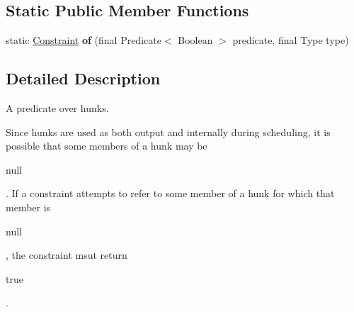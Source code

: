 \subsection*{Static Public Member Functions}
\begin{DoxyCompactItemize}
\item 
\hypertarget{interfaceosd_1_1considerations_1_1_constraint_aa9c71385c629e7bc5d9361f707d39622}{static \hyperlink{interfaceosd_1_1considerations_1_1_constraint}{Constraint} {\bfseries of} (final Predicate$<$ Boolean $>$ predicate, final Type type)}\label{interfaceosd_1_1considerations_1_1_constraint_aa9c71385c629e7bc5d9361f707d39622}

\end{DoxyCompactItemize}


\subsection{Detailed Description}
A predicate over hunks. 

Since hunks are used as both output and internally during scheduling, it is possible that some members of a hunk may be
\begin{DoxyCode}
null 
\end{DoxyCode}
 . If a constraint attempts to refer to some member of a hunk for which that member is
\begin{DoxyCode}
null 
\end{DoxyCode}
 , the constraint msut return
\begin{DoxyCode}
\textcolor{keyword}{true} 
\end{DoxyCode}
 .


